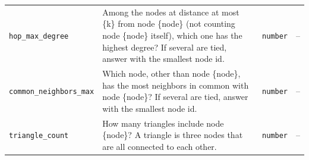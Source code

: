 {\begin{longtable}{>{\raggedright\arraybackslash}p{3.4cm} >{\raggedright\arraybackslash}p{5.4cm} >{\raggedright\arraybackslash}p{2.2cm} >{\raggedright\arraybackslash}p{3.2cm}}
    \texttt{hop\_max\_degree} & Among the nodes at distance at most \{k\} from node \{node\} (not counting node \{node\} itself), which one has the highest degree? If several are tied, answer with the smallest node id. & \texttt{number} & -- \\
    \texttt{common\_neighbors\_max} & Which node, other than node \{node\}, has the most neighbors in common with node \{node\}? If several are tied, answer with the smallest node id. & \texttt{number} & -- \\
    \texttt{triangle\_count} & How many triangles include node \{node\}? A triangle is three nodes that are all connected to each other. & \texttt{number} & -- \\
\end{longtable}
}
